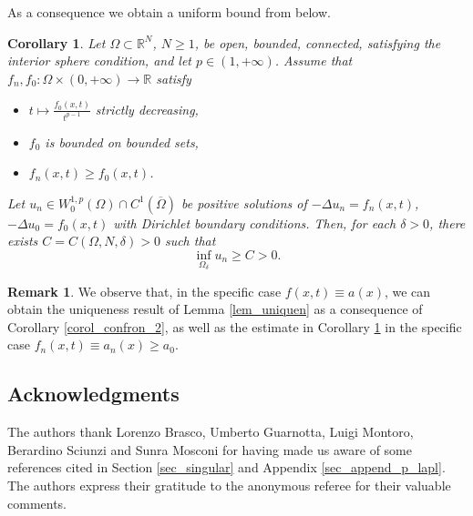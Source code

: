 \documentclass[11pt, reqno]{amsart}
\DeclareRobustCommand{\SkipTocEntry}[5]{}
\newtheorem{corollary}[lemma]{Corollary}
\theoremstyle{definition}
\newtheorem{remark}[lemma]{Remark}
\numberwithin{equation}{section}
\newcommand{\R}{\mathbb{R}}
\begin{document}
As a consequence we obtain a uniform bound from below. 
\begin{corollary}
\label{corol_stima_basso}
Let $\Omega \subset \R^N$, $N \geq 1$, be open, bounded, connected, satisfying the interior sphere condition, and let $p \in (1,+\infty)$. 
Assume that $f_n, f_0: \Omega \times (0,+\infty) \to \R$ satisfy
\begin{itemize}
\item $t \mapsto \frac{f_0(x, t)}{t^{p-1}}$ strictly decreasing, 
\item $f_0$ is bounded on bounded sets,
\item $f_n(x,t) \geq f_0(x,t)$.
\end{itemize}
Let $u_n \in W^{1,p}_0(\Omega) \cap C^1(\overline{\Omega})$ be positive solutions of $-\Delta u_n = f_n(x,t)$, $-\Delta u_0 = f_0(x,t)$ with Dirichlet boundary conditions. 
Then, for each $\delta>0$, there exists $C=C(\Omega, N, \delta)>0$ such that
$$\inf_{\Omega_{\delta}} u_n \geq C >0.$$
\end{corollary}

\begin{remark}
We observe that, in the specific case $f(x,t) \equiv a(x)$, we can obtain the uniqueness result of Lemma \ref{lem_uniquen} as a consequence of Corollary \ref{corol_confron_2}, as well as the estimate in Corollary \ref{corol_stima_basso} in the specific case $f_n(x,t) \equiv a_n(x) \geq a_{0}$. 
\end{remark}


\subsection*{Acknowledgments}

The authors thank Lorenzo Brasco, Umberto Guarnotta, Luigi Montoro, Berardino Sciunzi and Sunra Mosconi for having made us aware of some references cited in Section \ref{sec_singular} and Appendix \ref{sec_append_p_lapl}.
The authors express their gratitude to the anonymous referee for their valuable comments.
\end{document}
